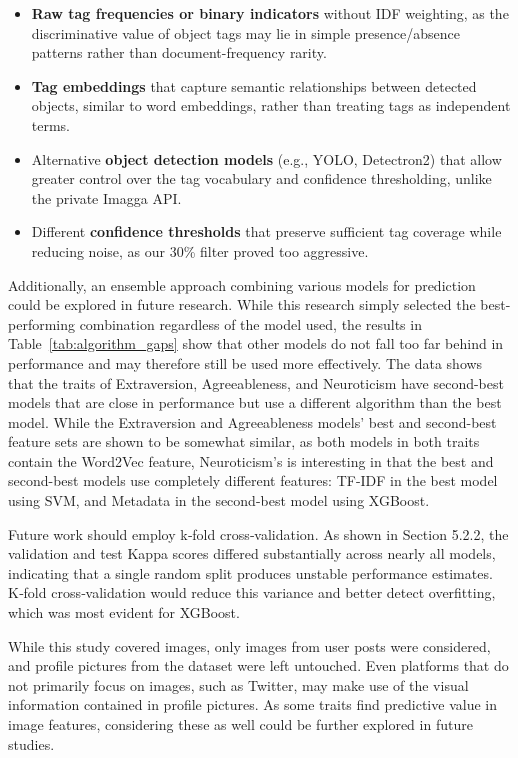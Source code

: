 \begin{itemize}
	\item \textbf{Raw tag frequencies or binary indicators} without IDF weighting, as the discriminative value of object tags may lie in simple presence/absence patterns rather than document-frequency rarity.
	\item \textbf{Tag embeddings} that capture semantic relationships between detected objects, similar to word embeddings, rather than treating tags as independent terms.
	\item Alternative \textbf{object detection models} (e.g., YOLO, Detectron2) that allow greater control over the tag vocabulary and confidence thresholding, unlike the private Imagga API.
	\item Different \textbf{confidence thresholds} that preserve sufficient tag coverage while reducing noise, as our 30\% filter proved too aggressive.
\end{itemize}

Additionally, an ensemble approach combining various models for prediction could be explored in future research. While this research simply selected the best-performing combination regardless of the model used, the results in Table~\ref{tab:algorithm_gaps} show that other models do not fall too far behind in performance and may therefore still be used more effectively. The data shows that the traits of Extraversion, Agreeableness, and Neuroticism have second-best models that are close in performance but use a different algorithm than the best model. While the Extraversion and Agreeableness models’ best and second-best feature sets are shown to be somewhat similar, as both models in both traits contain the Word2Vec feature, Neuroticism’s is interesting in that the best and second-best models use completely different features: TF-IDF in the best model using SVM, and Metadata in the second-best model using XGBoost.

Future work should employ k‑fold cross‑validation. As shown in Section 5.2.2, the validation and test Kappa scores differed substantially across nearly all models, indicating that a single random split produces unstable performance estimates. K‑fold cross‑validation would reduce this variance and better detect overfitting, which was most evident for XGBoost.

While this study covered images, only images from user posts were considered, and profile pictures from the dataset were left untouched. Even platforms that do not primarily focus on images, such as Twitter, may make use of the visual information contained in profile pictures. As some traits find predictive value in image features, considering these as well could be further explored in future studies. 

